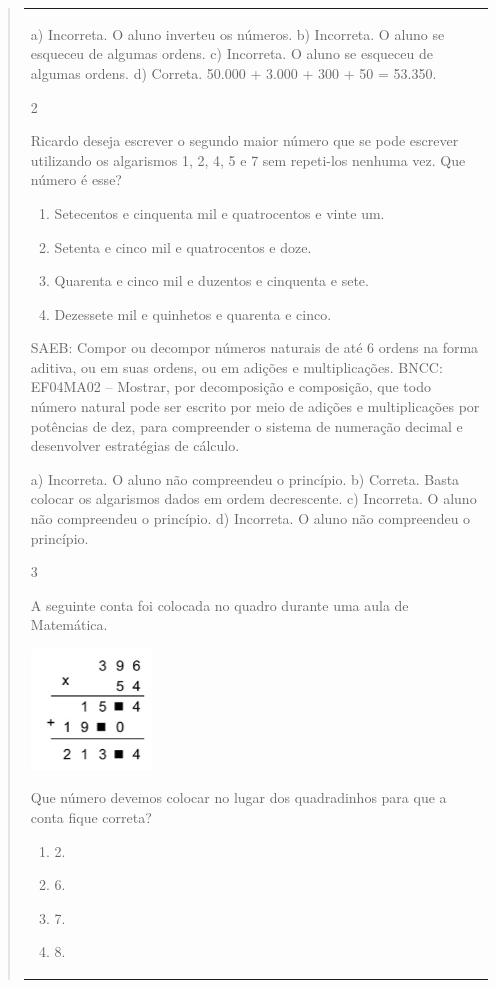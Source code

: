 \begin{mdframed}[linewidth=2pt,linecolor=salmao,roundcorner=2pt]
\begin{itemize}
{\begin{itemize}
\begin{escolha}
{\begin{quote}
{\begin{escolha}
{{{{{\begin{longtable}[]{@{}l@{}}
\begin{itemize}
{a) Incorreta. O aluno inverteu os números.
b) Incorreta. O aluno se esqueceu de algumas ordens.
c) Incorreta. O aluno se esqueceu de algumas ordens.
d) Correta. 50.000 + 3.000 + 300 + 50 = 53.350.

\num{2}

Ricardo deseja escrever o segundo maior número que se pode escrever
utilizando os algarismos 1, 2, 4, 5 e 7 sem repeti-los nenhuma vez.
Que número é esse?

\begin{enumerate}
\item
  Setecentos e cinquenta mil e quatrocentos e vinte um.
\item
  Setenta e cinco mil e quatrocentos e doze.
\item
  Quarenta e cinco mil e duzentos e cinquenta e sete.
\item
  Dezessete mil e quinhetos e quarenta e cinco.
\end{enumerate}

SAEB: Compor ou decompor números naturais de até 6 ordens na
forma aditiva, ou em suas ordens, ou em adições e multiplicações.
BNCC: EF04MA02 -- Mostrar, por decomposição e composição, que todo número natural pode ser escrito
por meio de adições e multiplicações por potências de dez, para compreender o sistema de
numeração decimal e desenvolver estratégias de cálculo.

a) Incorreta. O aluno não compreendeu o princípio.
b) Correta. Basta colocar os algarismos dados em ordem decrescente.
c) Incorreta. O aluno não compreendeu o princípio.
d) Incorreta. O aluno não compreendeu o princípio.

\num{3}

A seguinte conta foi colocada no quadro durante uma aula de Matemática.

\includegraphics[width=1.26282in,height=1.25762in]{media/image159.png}

Que número devemos colocar no lugar dos quadradinhos para que a conta
fique correta?

\begin{enumerate}
\item
  2.
\item
  6.
\item
  7.
\item
  8.
\end{enumerate}

}
\end{itemize}
\end{longtable}}}}}}
\end{escolha}}
\end{quote}}
\end{escolha}
\end{itemize}}
\end{itemize}
\end{mdframed}
